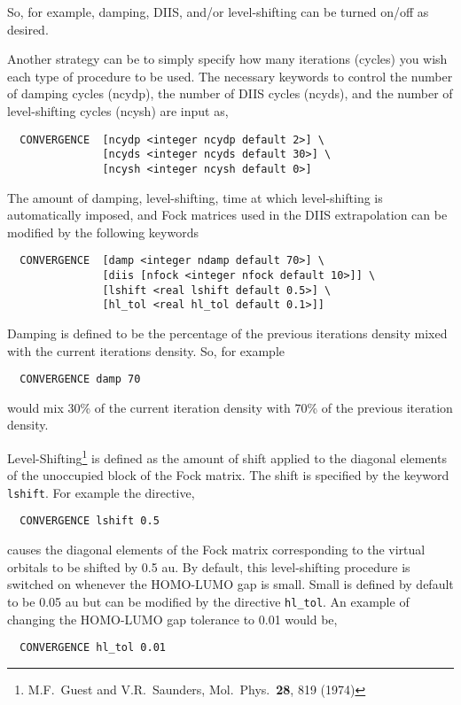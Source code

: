 So, for example, damping, DIIS, and/or level-shifting can be turned
on/off as desired.

Another strategy can be to simply specify how many iterations (cycles) you wish
each type of procedure to be used.  The necessary keywords to control
the number of damping cycles (ncydp), the number of DIIS cycles
(ncyds), and the number of level-shifting cycles (ncysh) are input as,
\begin{verbatim}
  CONVERGENCE  [ncydp <integer ncydp default 2>] \
               [ncyds <integer ncyds default 30>] \
               [ncysh <integer ncysh default 0>]
\end{verbatim}

The amount of damping, level-shifting, time at which level-shifting is
automatically imposed, and Fock matrices used in the DIIS
extrapolation can be modified by the following keywords
\begin{verbatim}
  CONVERGENCE  [damp <integer ndamp default 70>] \
               [diis [nfock <integer nfock default 10>]] \
               [lshift <real lshift default 0.5>] \
               [hl_tol <real hl_tol default 0.1>]]
\end{verbatim}

Damping is defined to be the percentage of the previous iterations
density mixed with the current iterations density.  So, for example 
\begin{verbatim}
  CONVERGENCE damp 70
\end{verbatim}
would mix 30\% of the current iteration density with 70\% of the
previous iteration density.

Level-Shifting\footnote {M.F.~Guest and 
V.R.~Saunders, Mol.~Phys.~{\bf 28}, 819 (1974)} is defined as the
amount of shift applied to the diagonal elements of the unoccupied
block of the Fock matrix.  The shift is specified by the
keyword \verb+lshift+.  For example the directive,
\begin{verbatim}
  CONVERGENCE lshift 0.5
\end{verbatim}
causes the diagonal elements of the Fock matrix
corresponding to the virtual orbitals to be shifted by 0.5 au.
By default, this level-shifting procedure is switched on whenever the
HOMO-LUMO gap is small.  Small is defined by default to be 0.05 au but
can be modified by the directive \verb+hl_tol+.  An example of
changing the HOMO-LUMO gap tolerance to 0.01 would be,
\begin{verbatim}
  CONVERGENCE hl_tol 0.01
\end{verbatim}

